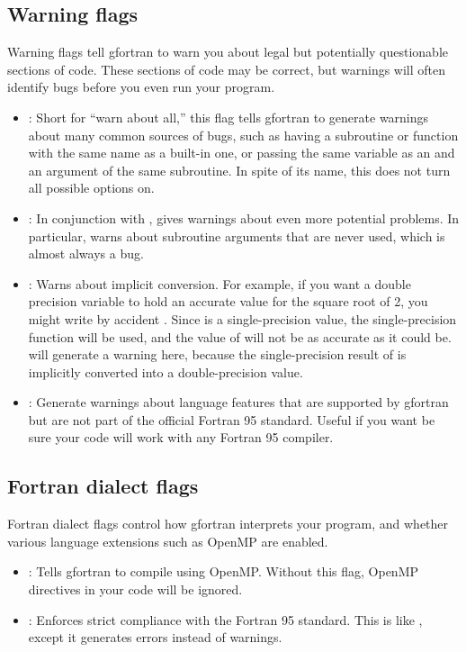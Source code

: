 \documentclass[letterpaper,10pt,english]{sphinxmanual}
\begin{document}
\subsection{Warning flags}
\label{gfortran_flags:warning-flags}
Warning flags tell gfortran to warn you about legal but potentially
questionable sections of code.  These sections of code may be correct,
but warnings will often identify bugs before you even run your
program.
\begin{itemize}
\item {} 
: Short for ``warn about all,'' this flag tells gfortran to
generate warnings about many common sources of bugs, such as having
a subroutine or function with the same name as a built-in one, or
passing the same variable as an  and an
 argument of the same subroutine.
In spite of its name, this does not turn all possible  options on.

\item {} 
: In conjunction with , gives warnings about
even more potential problems.  In particular,  warns
about subroutine arguments that are never used, which is almost
always a bug.

\item {} 
: Warns about implicit conversion. For example, if
you want a double precision variable  to hold an accurate
value for the square root of 2, you might write by accident .  Since  is a single-precision value, the
single-precision  function will be used, and the value of
 will not be as accurate as it could be.  
will generate a warning here, because the single-precision result
of  is implicitly converted into a double-precision value.

\item {} 
: Generate warnings about language features that are
supported by gfortran but are not part of the official Fortran 95
standard.  Useful if you want be sure your code will work with any
Fortran 95 compiler.

\end{itemize}


\subsection{Fortran dialect flags}
\label{gfortran_flags:fortran-dialect-flags}
Fortran dialect flags control how gfortran interprets your program,
and whether various language extensions such as OpenMP are enabled.
\begin{itemize}
\item {} 
: Tells gfortran to compile using OpenMP.  Without this
flag, OpenMP directives in your code will be ignored.

\item {} 
: Enforces strict compliance with the Fortran 95
standard.  This is like , except it generates errors
instead of warnings.

\end{itemize}
\end{document}

